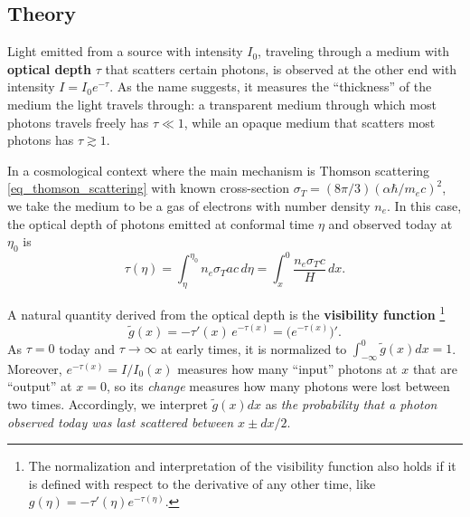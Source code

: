 \documentclass[10pt,a4paper]{article}
\begin{document}
\subsection{Theory}

Light emitted from a source with intensity $I_0$,
traveling through a medium with \textbf{optical depth} $\tau$ that scatters certain photons,
is observed at the other end with intensity $I = I_0 e^{-\tau}$.
As the name suggests, it measures the ``thickness'' of the medium the light travels through:
a transparent medium through which most photons travels freely has $\tau \ll 1$,
while an opaque medium that scatters most photons has $\tau \gtrsim 1$.

In a cosmological context where the main mechanism is Thomson scattering \eqref{eq_thomson_scattering} with known cross-section $\sigma_T = (8\pi/3) (\alpha \hbar / m_e c)^2$,
we take the medium to be a gas of electrons with number density $n_e$.
In this case, the optical depth of photons emitted at conformal time $\eta$ and observed today at $\eta_0$ is
\begin{equation}
	\tau(\eta) = \int_\eta^{\eta_0} n_e \sigma_T a c \, d\eta = \int_x^0 \frac{n_e \sigma_T c}{H} \, dx.
\label{eq_optical_depth}
\end{equation}

A natural quantity derived from the optical depth is the \textbf{visibility function}%
\footnote{The normalization and interpretation of the visibility function also holds if it is defined with respect to the derivative of any other time, like $g(\eta) = -\tau'(\eta) e^{-\tau(\eta)}$.}
\begin{equation}
	\tilde{g}(x) = -\tau'(x) \, e^{-\tau(x)} = \Big( e^{-\tau(x)} \Big)'.
\label{eq_visibility_function}
\end{equation}
As $\tau=0$ today and $\tau \rightarrow \infty$ at early times,
it is normalized to $\int_{-\infty}^0 \tilde{g}(x) dx = 1$.
Moreover, $e^{-\tau(x)} = I/I_0(x)$ measures how many ``input'' photons at $x$ that are ``output'' at $x=0$,
so its \emph{change} measures how many photons were lost between two times.
Accordingly, we interpret $\tilde{g}(x) dx$ as \emph{the probability that a photon observed today was last scattered between $x \pm dx/2$}.
\end{document}

